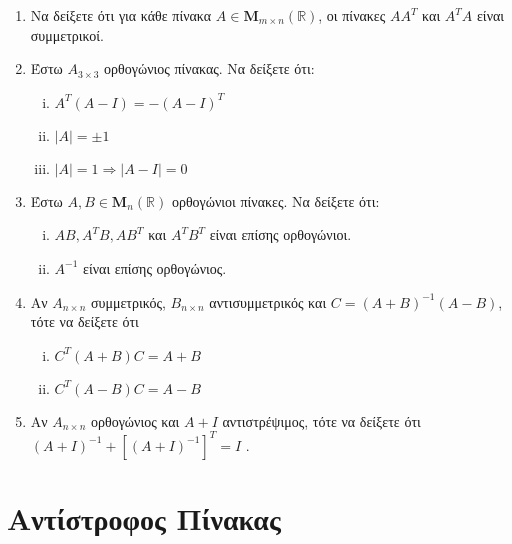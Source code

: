 \begin{enumerate}
  \item Να δείξετε ότι για κάθε πίνακα $ A \in \textbf{M}_{m \times n}(\mathbb{R}) $, 
    οι πίνακες $ AA^{T} $ και $ A^{T}A $ είναι συμμετρικοί.

  \item Έστω $ A_{3\times 3} $ ορθογώνιος πίνακας. Να δείξετε ότι:
    \begin{enumerate}[i)]
      \item $ A^{T}(A-I) = -(A-I)^{T} $
      \item $ |A|=\pm 1 $
      \item $ |A|=1 \Rightarrow |A-I|=0 $
    \end{enumerate}

  \item Έστω $ A,B \in \textbf{M}_{n}(\mathbb{R}) $ ορθογώνιοι πίνακες. Να δείξετε ότι: 
    \begin{enumerate}[i)]
      \item $ AB, A^{T}B, AB^{T} $ και $ A^{T}B^{T} $ είναι επίσης ορθογώνιοι.
      \item $ A^{-1} $ είναι επίσης ορθογώνιος.
    \end{enumerate}

  \item Αν $A_{n\times n}$ συμμετρικός, $B_{n\times n}$ αντισυμμετρικός και 
    $C =(A+B)^{-1}(A-B) $, τότε να δείξετε ότι 
    \begin{enumerate}[i)]
      \item $C^{T}(A+B)C=A+B $
      \item $ C^{T}(A-B)C=A-B $
    \end{enumerate}

  \item Αν $A_{n\times n}$ ορθογώνιος και $ A+I $ αντιστρέψιμος, τότε να δείξετε ότι 
    $ (A+I)^{-1} + [(A+I)^{-1}]^{T} = I $ .
\end{enumerate}


\section*{Αντίστροφος Πίνακας}

